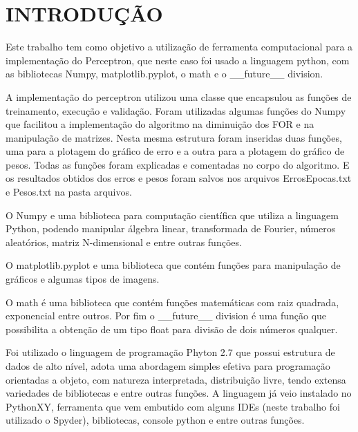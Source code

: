 \documentclass[
12pt, 
a4paper,
oneside,			%
english,			%
french,				%
spanish,			%
brazil,	
]{abntex2}
\author{Leonardo Vieira Guimarães}
\date{Outubro 2014}
\begin{document}
	\imprimircapa
	\imprimirfolhaderosto
	
	\tableofcontents*
	\cleardoublepage
	\textual

	
	\chapter*[INTRODUÇÃO]{INTRODUÇÃO}
	
	Este trabalho tem como objetivo a utilização de ferramenta computacional para a implementação do Perceptron, que neste caso foi usado a linguagem python, com as bibliotecas Numpy, matplotlib.pyplot, o math e o \_\_future\_\_ division. 	
	
	A implementação do perceptron utilizou uma classe que encapsulou as funções de treinamento, execução e validação. Foram utilizadas algumas funções do Numpy que facilitou a implementação do algoritmo na diminuição dos FOR e na manipulação de matrizes. Nesta mesma estrutura foram inseridas  duas funções, uma para a plotagem do gráfico de erro e a outra para a plotagem do gráfico de pesos. Todas as funções foram explicadas e comentadas no corpo do algoritmo. E os resultados obtidos dos erros e pesos foram salvos nos arquivos ErrosEpocas.txt e Pesos.txt na pasta arquivos. 
	
	O Numpy e uma biblioteca para computação científica que utiliza a linguagem Python, podendo manipular álgebra linear, transformada de Fourier, números aleatórios, matriz N-dimensional e entre outras funções. \cite{python}
	
	O matplotlib.pyplot e uma biblioteca que contém funções para manipulação de gráficos e algumas tipos de imagens.
	
	O math é uma biblioteca que contém funções matemáticas com raiz quadrada, exponencial entre outros. Por fim o \_\_future\_\_ division é uma função que possibilita a obtenção de um tipo float para divisão de dois números qualquer. 
	
	Foi utilizado o linguagem de programação Phyton 2.7 que possui estrutura de dados de alto nível, adota uma abordagem simples efetiva para programação orientadas a objeto, com natureza interpretada, distribuição livre, tendo extensa variedades de bibliotecas e entre outras funções. A linguagem já veio instalado no PythonXY, ferramenta que vem embutido com alguns IDEs (neste trabalho foi utilizado o Spyder), bibliotecas, console python e entre outras funções.   
	
\end{document}
